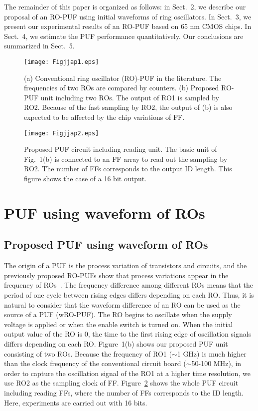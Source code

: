 \documentclass[%
reprint, amsmath,amssymb,%
pra,
]{revtex4-1}
\begin{document}
The remainder of this paper is organized as follows: in Sect.~2, we describe
our proposal of an RO-PUF using initial waveforms of ring oscillators.
In Sect.~3, we present our experimental results of an RO-PUF based on 
65 nm CMOS chips.
In Sect.~4, we estimate the PUF performance quantitatively. 
Our conclusions are summarized in Sect.~5.

\begin{figure}
\begin{center}
\texttt{[image: Figjjap1.eps]}
\end{center}
\caption{(a) Conventional  ring oscillator (RO)-PUF in the literature. 
The frequencies of two ROs are compared by counters. 
(b) Proposed RO-PUF unit including two ROs. The output of RO1 is sampled by RO2. 
Because of the fast sampling by RO2, the output of (b) is also expected to be affected by the chip variations of FF.}
\label{f1}
\end{figure}

\begin{figure}
\begin{center}
\texttt{[image: Figjjap2.eps]}
\end{center}
\caption{Proposed PUF circuit including reading unit. 
The basic unit of Fig.~1(b) is connected to an FF array to read out the sampling by RO2. 
The number of FFs corresponds to the output ID length. This figure shows the case of a 16 bit output.}
\label{circuit}
\end{figure}



\section{PUF using waveform of ROs}
\subsection{Proposed PUF using waveform of ROs}
 The origin of a PUF is the process variation of transistors and circuits, 
and the previously proposed RO-PUFs show that process variations appear 
in the frequency of ROs~\cite{Suh}. 
The frequency difference among different ROs means that the period of one cycle 
between rising edges differs depending on each RO. 
Thus, it is natural to consider that the waveform difference of an RO can be used as the source of a PUF (wRO-PUF). 
The RO begins to oscillate when the supply voltage is applied or when the enable switch is turned on. 
When the initial output value of the RO is 0, 
the time to the first rising edge of oscillation signals differs depending on each RO. 
Figure~1(b) shows our proposed PUF unit consisting of two ROs. 
Because the frequency of RO1 ($\sim$1 GHz) is much higher than the clock frequency of the conventional 
circuit board ($\sim$50-100 MHz), in order to capture the oscillation signal of the RO1 at a higher time resolution, 
we use RO2 as the sampling clock of FF. 
Figure~\ref{circuit} shows the whole PUF circuit including reading FFs, 
where the number of FFs corresponds to the ID length. Here, experiments are carried out with 16 bits. 
\end{document}
